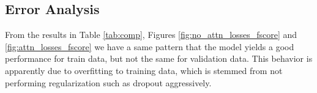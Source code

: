 \documentclass[11pt,a4paper]{article}
\begin{document}

\subsection{Error Analysis} \label{sec:improve}

From the results in Table \ref{tab:comp}, Figures \ref{fig:no_attn_losses_fscore} and \ref{fig:attn_losses_fscore} we have a same pattern that the model yields a good performance for train data, but not the same for validation data. This behavior is apparently due to overfitting to training data, which is stemmed from not performing regularization such as dropout aggressively. 
\end{document}
